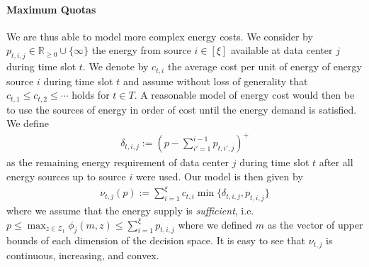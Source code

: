 \paragraph{Maximum Quotas} We are thus able to model more complex energy costs. We consider by $p_{t,i,j} \in \mathbb{R}_{\geq 0} \cup \{\infty\}$ the energy from source $i \in [\xi]$ available at data center $j$ during time slot $t$. We denote by $c_{t,i}$ the average cost per unit of energy of energy source $i$ during time slot $t$ and assume without loss of generality that $c_{t,1} \leq c_{t,2} \leq \cdots$ holds for $t \in T$. A reasonable model of energy cost would then be to use the sources of energy in order of cost until the energy demand is satisfied. We define \begin{align*}
    \delta_{t,i,j} := (p - \sum_{i'=1}^{i-1} p_{t,i',j})^+
\end{align*} as the remaining energy requirement of data center $j$ during time slot $t$ after all energy sources up to source $i$ were used. Our model is then given by \begin{align*}
    \nu_{t,j}(p) := \sum_{i=1}^{\xi} c_{t,i} \min\{\delta_{t,i,j}, p_{t,i,j}\}
\end{align*} where we assume that the energy supply is \emph{sufficient}, i.e. $p \leq \max_{z \in \mathcal{Z}_t} \phi_j(m,z) \leq \sum_{i=1}^{\xi} p_{t,i,j}$ where we defined $m$ as the vector of upper bounds of each dimension of the decision space. It is easy to see that $\nu_{t,j}$ is continuous, increasing, and convex.

